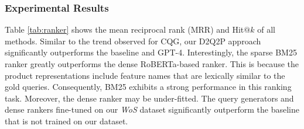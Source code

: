 \subsubsection{Experimental Results}
Table \ref{tab:ranker} shows the mean reciprocal rank (MRR) and Hit$@k$ of all methods. 
Similar to the trend observed for CQG, our D2Q2P approach significantly outperforms the baseline and GPT-4. Interestingly, the sparse BM25 ranker greatly outperforms the dense RoBERTa-based ranker. This is because the product representations include feature names that are lexically similar to the gold queries. Consequently, BM25 exhibits a strong performance in this ranking task. Moreover, the dense ranker may be under-fitted. The query generators and dense rankers fine-tuned on our \textit{WoS} dataset significantly outperform the baseline that is not trained on our dataset.

